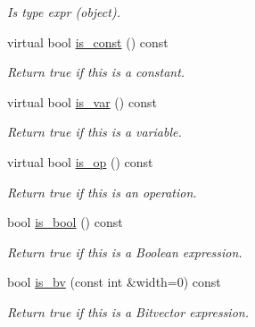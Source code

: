 \begin{DoxyCompactItemize}
\begin{DoxyCompactList}\small\item\em Is type expr (object). \end{DoxyCompactList}\item 
\mbox{\label{classilang_1_1_expr_a88fa46a81a6c6721422554fe7782baf6}} 
virtual bool \mbox{\hyperlink{classilang_1_1_expr_a88fa46a81a6c6721422554fe7782baf6}{is\+\_\+const}} () const
\begin{DoxyCompactList}\small\item\em Return true if this is a constant. \end{DoxyCompactList}\item 
\mbox{\label{classilang_1_1_expr_adadcf17850a63a10113b4ff67974cd81}} 
virtual bool \mbox{\hyperlink{classilang_1_1_expr_adadcf17850a63a10113b4ff67974cd81}{is\+\_\+var}} () const
\begin{DoxyCompactList}\small\item\em Return true if this is a variable. \end{DoxyCompactList}\item 
\mbox{\label{classilang_1_1_expr_aad5a4bcf898a629e1f21a545fddbf23a}} 
virtual bool \mbox{\hyperlink{classilang_1_1_expr_aad5a4bcf898a629e1f21a545fddbf23a}{is\+\_\+op}} () const
\begin{DoxyCompactList}\small\item\em Return true if this is an operation. \end{DoxyCompactList}\item 
\mbox{\label{classilang_1_1_expr_add8f1b3ac85ba3f98c3be0fcd59a91b1}} 
bool \mbox{\hyperlink{classilang_1_1_expr_add8f1b3ac85ba3f98c3be0fcd59a91b1}{is\+\_\+bool}} () const
\begin{DoxyCompactList}\small\item\em Return true if this is a Boolean expression. \end{DoxyCompactList}\item 
\mbox{\label{classilang_1_1_expr_a6629f3bd2dfe287824e25c91aea5245a}} 
bool \mbox{\hyperlink{classilang_1_1_expr_a6629f3bd2dfe287824e25c91aea5245a}{is\+\_\+bv}} (const int \&width=0) const
\begin{DoxyCompactList}\small\item\em Return true if this is a Bitvector expression. \end{DoxyCompactList}\item 

\end{DoxyCompactItemize}
